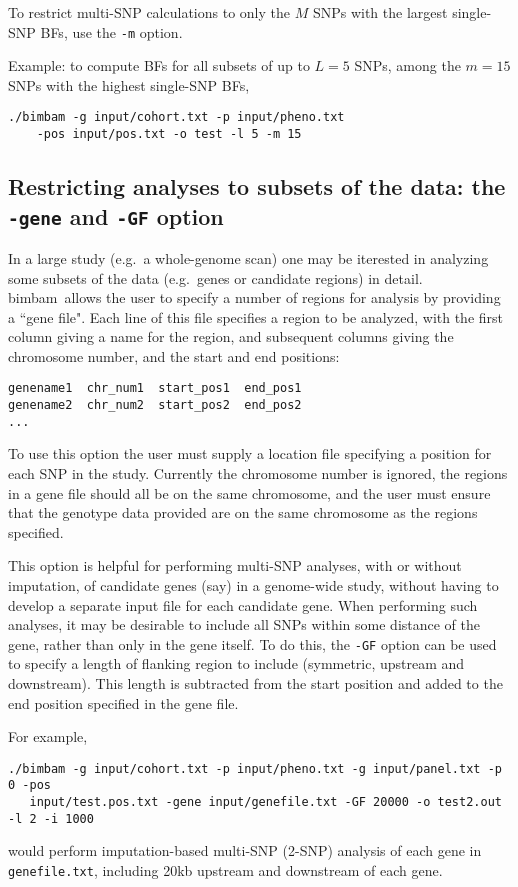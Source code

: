 \documentclass[11pt,Palatino]{article}
\def\bimbam{{\sc bimbam}~}
\begin{document}
To restrict multi-SNP calculations to only the $M$ SNPs with the largest single-SNP BFs,
use the {\tt -m} option.

Example: to compute BFs for all subsets of up to $L=5$ SNPs, among the $m=15$ SNPs with
the highest single-SNP BFs,
\begin{verbatim}
./bimbam -g input/cohort.txt -p input/pheno.txt
    -pos input/pos.txt -o test -l 5 -m 15
\end{verbatim}

\subsection{Restricting analyses to subsets of the data: the {\tt -gene} and {\tt-GF} option}

In a large study (e.g.~a whole-genome scan) one may be iterested in analyzing some subsets
of the data (e.g.~genes or candidate regions) in detail. \bimbam allows the user to specify a number
of regions for analysis by providing a ``gene file". Each line of this file specifies a region to be analyzed,
with the first column giving a name for the region, and subsequent columns giving the chromosome number,
and the start and end positions:
\begin{verbatim}
genename1  chr_num1  start_pos1  end_pos1
genename2  chr_num2  start_pos2  end_pos2
...
\end{verbatim}

To use this option the user must supply a location file specifying a position for each SNP in the study.
Currently the chromosome number is ignored, the regions in a gene file should all be on the same chromosome,
and the user must ensure that the genotype data provided are on the same chromosome as the regions specified.

This option is helpful for performing multi-SNP analyses, with or without imputation, of candidate genes (say) in a genome-wide study,
without having to develop a separate input file for each candidate gene. When performing such analyses, it may be desirable to
include all SNPs within some distance of the gene, rather than only in the gene itself. To do this, the {\tt -GF} option
can be used to specify a length of flanking region to include (symmetric, upstream and downstream). This length is subtracted
from the start position and added to the end position specified in the gene file.

For example,
\begin{verbatim}
./bimbam -g input/cohort.txt -p input/pheno.txt -g input/panel.txt -p 0 -pos 
   input/test.pos.txt -gene input/genefile.txt -GF 20000 -o test2.out -l 2 -i 1000
\end{verbatim}
would perform imputation-based multi-SNP (2-SNP) analysis of each gene in {\tt genefile.txt}, including 20kb upstream
and downstream of each gene.
\end{document}
